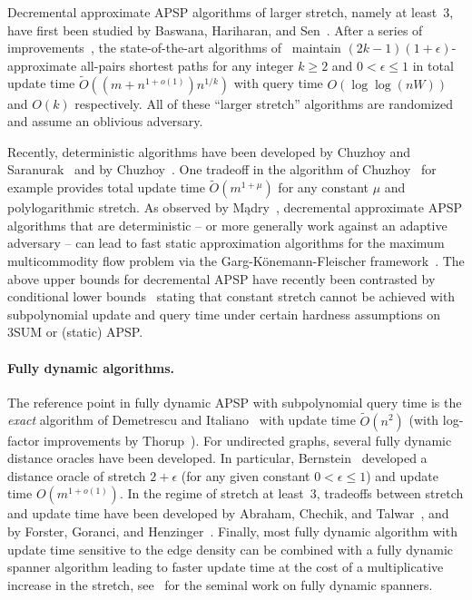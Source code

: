 Decremental approximate APSP algorithms of larger stretch, namely at least~$ 3 $, have first been studied by Baswana, Hariharan, and Sen~\cite{BaswanaHS03}.
After a series of improvements~\cite{RZ12, BR11, AbrahamCT14, henzinger2014decremental}, the state-of-the-art algorithms of~\cite{Chechik18,LN2020} maintain $ (2k-1)(1 + \epsilon) $-approximate all-pairs shortest paths for any integer $ k \geq 2 $ and $ 0 < \epsilon \leq 1 $ in total update time $ \tilde O ( (m+n^{1+o(1)})n^{1/k}) $ with query time  $O(\log \log (nW))$ and $O(k)$ respectively.
All of these ``larger stretch'' algorithms are randomized and assume an oblivious adversary.

Recently, deterministic algorithms have been developed by Chuzhoy and Saranurak~\cite{ChuzhoyS21} and by Chuzhoy~\cite{Chuzhoy21}.
One tradeoff in the algorithm of Chuzhoy~\cite{Chuzhoy21} for example provides total update time $ \tilde O (m^{1 + \mu}) $ for any constant $ \mu $ and polylogarithmic stretch.
As observed by M\k{a}dry~\cite{Madry10}, decremental approximate APSP algorithms that are deterministic -- or more generally work against an adaptive adversary -- can lead to fast static approximation algorithms for the maximum multicommodity flow problem via the Garg-Könemann-Fleischer framework~\cite{GargK07,Fleischer00}.
The above upper bounds for decremental APSP have recently been contrasted by conditional lower bounds~\cite{AbboudBKZ22} stating that constant stretch cannot be achieved with subpolynomial update and query time under certain hardness assumptions on 3SUM or (static) APSP.


\paragraph{Fully dynamic algorithms.}
The reference point in fully dynamic APSP with subpolynomial query time is the \emph{exact} algorithm of Demetrescu and Italiano~\cite{DemetrescuI04} with update time $ \tilde O (n^2) $ (with log-factor improvements by Thorup~\cite{Thorup04}).
For undirected graphs, several fully dynamic distance oracles have been developed.
In particular, Bernstein~\cite{Bernstein09} developed a distance oracle of stretch $ 2 + \epsilon $ (for any given constant $ 0 < \epsilon \leq 1 $) and update time $ O (m^{1 + o(1)}) $.
In the regime of stretch at least~$ 3 $, tradeoffs between stretch and update time have been developed by Abraham, Chechik, and Talwar~\cite{AbrahamCT14}, and by Forster, Goranci, and Henzinger~\cite{ForsterGH21}.
Finally, most fully dynamic algorithm with update time sensitive to the edge density can be combined with a fully dynamic spanner algorithm leading to faster update time at the cost of a multiplicative increase in the stretch, see~\cite{BaswanaKS12} for the seminal work on fully dynamic spanners.
